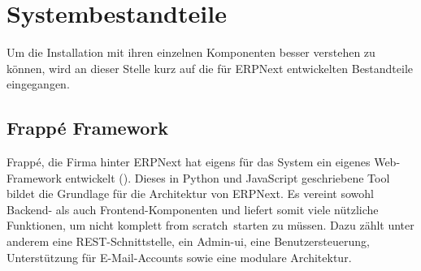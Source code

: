 \chapter{Systembestandteile}
\label{chap:funkt}
Um die Installation mit ihren einzelnen Komponenten besser verstehen zu können, wird an dieser Stelle kurz auf die für ERPNext entwickelten Bestandteile eingegangen.

\section{Frappé Framework}
Frappé, die Firma hinter ERPNext hat eigens für das System ein eigenes Web-Framework entwickelt (\vgl \cite{FrappeIo}). Dieses in Python und JavaScript geschriebene Tool bildet die Grundlage für die Architektur von ERPNext. Es vereint sowohl Backend- als auch Frontend-Komponenten und liefert somit viele nützliche Funktionen, um nicht komplett \glqq from scratch\grqq\ starten zu müssen. Dazu zählt unter anderem eine REST-Schnittstelle, ein Admin-\gls{ui}, eine Benutzersteuerung, Unterstützung für E-Mail-Accounts sowie eine modulare Architektur.

